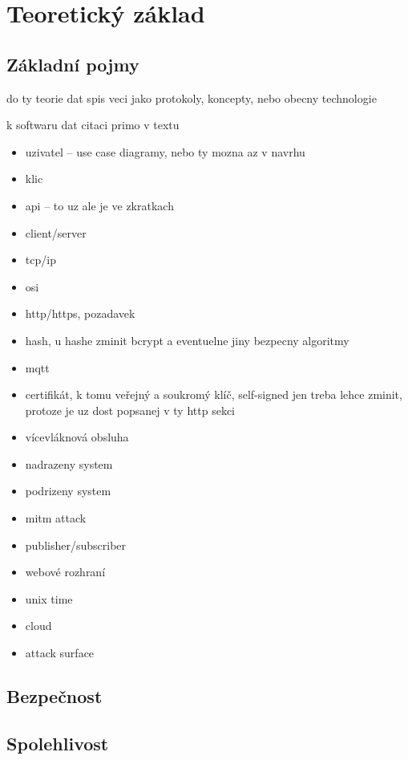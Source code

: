 \chapter{Teoretický základ}
\label{sec:te}

\section{Základní pojmy}

do ty teorie dat spis veci jako protokoly, koncepty, nebo obecny technologie

k softwaru dat citaci primo v textu

\begin{itemize}
    \item uzivatel -- use case diagramy, nebo ty mozna az v navrhu
    \item klic
    \item api -- to uz ale je ve zkratkach
    \item client/server
    \item tcp/ip
    \item osi
    \item http/https, pozadavek
    \item hash, u hashe zminit bcrypt a eventuelne jiny bezpecny algoritmy
    \item mqtt
    \item certifikát, k tomu veřejný a soukromý klíč, self-signed jen treba lehce zminit, protoze je uz dost popsanej v ty http sekci
    \item vícevláknová obsluha
    \item nadrazeny system
    \item podrizeny system
    \item mitm attack
    \item publisher/subscriber
    \item webové rozhraní
    \item unix time
    \item cloud
    \item attack surface
\end{itemize}

\section{Bezpečnost}

\section{Spolehlivost}